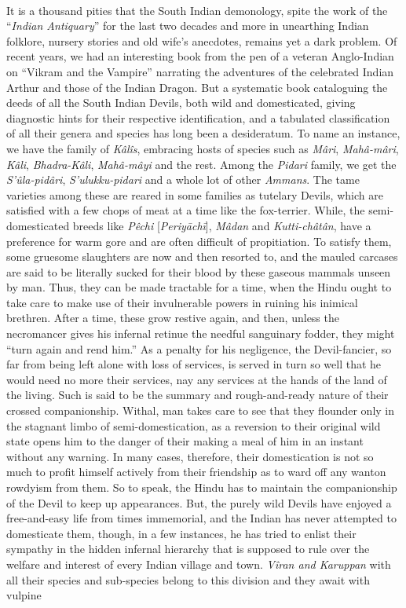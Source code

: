 \documentclass[a4paper, 12pt, oneside, english, twocolumn]{article}
\begin{document}
\paragraph{}
It is a thousand pities that the South Indian demonology, spite the work of the ``\emph{Indian Antiquary}'' for the last two decades and more in unearthing Indian folklore, nursery stories and old wife's anecdotes, remains yet a dark problem. Of recent years, we had an interesting book from the pen of a veteran Anglo-Indian on ``Vikram and the Vampire'' narrating the adventures of the celebrated Indian Arthur and those of the Indian Dragon. But a systematic book cataloguing the deeds of all the South Indian Devils, both wild and domesticated, giving diagnostic hints for their respective identification, and a tabulated classification of all their genera and species has long been a desideratum. To name an instance, we have the family of \emph{Kâlîs}, embracing hosts of species such as \emph{Mâri}, \emph{Mahâ-mâri}, \emph{Kâli}, \emph{Bhadra-Kâli}, \emph{Mahâ-mâyi} and the rest. Among the \emph{Pidari} family, we get the \emph{S'ûla-pidâri}, \emph{S'ulukku-pidari} and a whole lot of other \emph{Ammans}. The tame varieties among these are reared in some families as tutelary Devils, which are satisfied with a few chops of meat at a time like the fox-terrier. While, the semi-domesticated breeds like \emph{Pêchi} [\emph{Periyāchī}], \emph{Mâdan} and \emph{Kutti-châtân}, have a preference for warm gore and are often difficult of propitiation. To satisfy them, some gruesome slaughters are now and then resorted to, and the mauled carcases are said to be literally sucked for their blood by these gaseous mammals unseen by man. Thus, they can be made tractable for a time, when the Hindu ought to take care to make use of their invulnerable powers in ruining his inimical brethren. After a time, these grow restive again, and then, unless the necromancer gives his infernal retinue the needful sanguinary fodder, they might ``turn again and rend him.'' As a penalty for his negligence, the Devil-fancier, so far from being left alone with loss of services, is served in turn so well that he would need no more their services, nay any services at the hands of the land of the living. Such is said to be the summary and rough-and-ready nature of their crossed companionship. Withal, man takes care to see that they flounder only in the stagnant limbo of semi-domestication, as a reversion to their original wild state opens him to the danger of their making a meal of him in an instant without any warning. In many cases, therefore, their domestication is not so much to profit himself actively from their friendship as to ward off any wanton rowdyism from them. So to speak, the Hindu has to maintain the companionship of the Devil to keep up appearances. But, the purely wild Devils have enjoyed a free-and-easy life from times immemorial, and the Indian has never attempted to domesticate them, though, in a few instances, he has tried to enlist their sympathy in the hidden infernal hierarchy that is supposed to rule over the welfare and interest of every Indian village and town. \emph{Vîran and Karuppan} with all their species and sub-species belong to this division and they await with vulpine 
\end{document}
